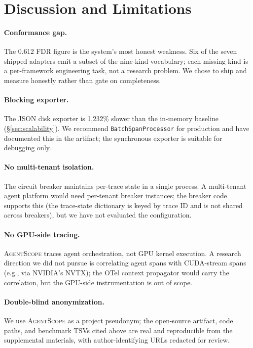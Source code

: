 \documentclass[sigplan,10pt,anonymous,review]{acmart}
\newcommand{\sysname}{\textsc{AgentScope}\xspace}
\begin{document}
\section{Discussion and Limitations}
\label{sec:discussion}

\paragraph{Conformance gap.} The 0.612 FDR figure is the system's most
honest weakness. Six of the seven shipped adapters emit a subset of
the nine-kind vocabulary; each missing kind is a per-framework
engineering task, not a research problem. We chose to ship and measure
honestly rather than gate on completeness.

\paragraph{Blocking exporter.} The JSON disk exporter is 1{,}232\%
slower than the in-memory baseline (\S\ref{sec:scalability}). We
recommend \texttt{BatchSpanProcessor} for production and have
documented this in the artifact; the synchronous exporter is suitable
for debugging only.

\paragraph{No multi-tenant isolation.} The circuit breaker maintains
per-trace state in a single process. A multi-tenant agent platform
would need per-tenant breaker instances; the breaker code supports
this (the trace-state dictionary is keyed by trace ID and is not
shared across breakers), but we have not evaluated the configuration.

\paragraph{No GPU-side tracing.} \sysname{} traces agent
orchestration, not GPU kernel execution. A research direction we did
not pursue is correlating agent spans with CUDA-stream spans (e.g.,
via NVIDIA's NVTX); the OTel context propagator would carry the
correlation, but the GPU-side instrumentation is out of scope.

\paragraph{Double-blind anonymization.} We use \sysname{} as a
project pseudonym; the open-source artifact, code paths, and benchmark
TSVs cited above are real and reproducible from the supplemental
materials, with author-identifying URLs redacted for review.
\end{document}
